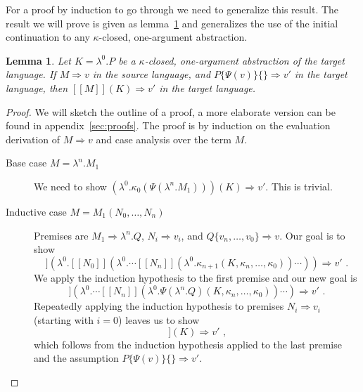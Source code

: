 \documentclass[a4paper,11pt,draft]{article}
\newtheorem{lemma}{\sffamily Lemma}
\begin{document}
For a proof by induction to go through we need to generalize this result. The
result we will prove is given as lemma~\ref{lem:mainlemma} and generalizes the
use of the initial continuation to any $\kappa$-closed, one-argument
abstraction.

\begin{lemma}\label{lem:mainlemma}
  Let $K = \lambda^{0}.P$ be a $\kappa$-closed, one-argument
  abstraction of the target language. If $M \Rightarrow v$ in the
  source language, and $P\{\Psi(v)\}\{\} \Rightarrow v'$ in the target
  language, then $[\![M]\!](K) \Rightarrow v'$ in the target language.
\end{lemma}

\begin{proof}
We will sketch the outline of a proof, a more elaborate version can be found in
appendix~\ref{sec:proofs}. The proof is by induction on the evaluation derivation
of $M \Rightarrow v$ and case analysis over the term $M$.
\begin{description}
\item[\sffamily Base case $M = \lambda^{n}.M_{1}$]\hfill

  We need to show
  $(\lambda^{0}.\kappa_{0}(\Psi(\lambda^{n}.M_{1}))) (K) \Rightarrow v'$.
  This is trivial.

\item[\sffamily Inductive case $M = M_{1}(N_{0}, \ldots, N_{n})$]\hfill

  Premises are $M_{1} \Rightarrow \lambda^{n}.Q$, $N_{i} \Rightarrow v_{i}$,
  and $Q\{v_{n}, \ldots, v_{0}\} \Rightarrow v$. Our goal is to show
  \begin{equation*}
    [\![M_{1}]\!]
    (\lambda^{0}.[\![N_{0}]\!](\lambda^{0}. \cdots
    [\![N_{n}]\!](\lambda^{0}.\kappa_{n+1}(K, \kappa_{n},
    \ldots, \kappa_{0})) \cdots ))
    \Rightarrow v' \text{ .}
  \end{equation*}
  We apply the induction hypothesis to the first premise and our new goal is
  \begin{equation*}
    [\![N_{0}]\!]
    (\lambda^{0}. \cdots [\![N_{n}]\!](\lambda^{0}.\Psi(\lambda^{n}.Q)
    (K, \kappa_{n}, \ldots, \kappa_{0})) \cdots )
    \Rightarrow v' \text{ .}
  \end{equation*}
  Repeatedly applying the induction hypothesis to premises
  $N_{i} \Rightarrow v_{i}$ (starting with $i=0$) leaves us to show
  \begin{equation*}
    [\![Q\{v_{n}, \ldots, v_{0}\}]\!] (K) \Rightarrow v' \text{ ,}
  \end{equation*}
  which follows from the induction hypothesis applied to the last premise and
  the assumption $P\{\Psi(v)\}\{\} \Rightarrow v'$.


\end{description}
\end{proof}
\end{document}
